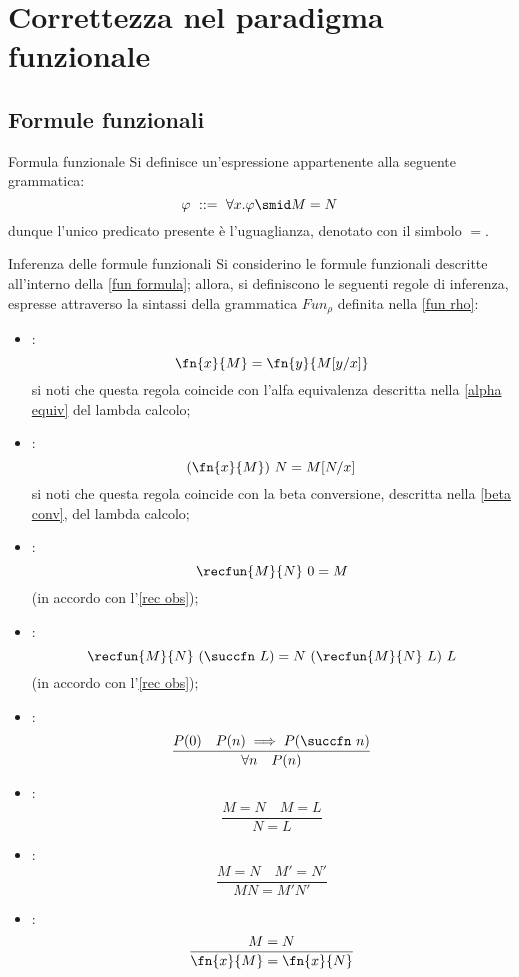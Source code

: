 \documentclass[a4paper, 12pt]{report}
\begin{document}
    \section{Correttezza nel paradigma funzionale}

    \subsection{Formule funzionali}

    \begin{frameddefn}[label={fun formula}]{Formula funzionale}
        Si definisce  un'espressione appartenente alla seguente grammatica: $$\varphi \ ::= \ \forall x.\varphi \smid M = N$$ dunque l'unico predicato presente è l'uguaglianza, denotato con il simbolo $=$.
    \end{frameddefn}

    \begin{framedprop}[label={= rules}, breakable]{Inferenza delle formule funzionali}
        Si considerino le formule funzionali descritte all'interno della \cref{fun formula}; allora, si definiscono le seguenti regole di inferenza, espresse attraverso la sintassi della grammatica $Fun_\rho$ definita nella \cref{fun rho}:

        \begin{itemize}
            \item {}: $$\fn{x}{M} = \fn{y}{M[y/x]}$$ si noti che questa regola coincide con l'alfa equivalenza descritta nella \cref{alpha equiv} del lambda calcolo;
            \item {}: $$(\fn{x}{M})\ N = M[N/x]$$ si noti che questa regola coincide con la beta conversione, descritta nella \cref{beta conv}, del lambda calcolo;
            \item {}: $$\recfun{M}{N} \ 0 = M$$ (in accordo con l'\cref{rec obs});
            \item {}: $$\recfun{M}{N} \ (\succfn \ L) = N \ (\recfun{M}{N} \ L) \ L$$ (in accordo con l'\cref{rec obs});
            \item {}: $$\dfrac{P(0) \quad P(n) \implies P(\succfn \ n)}{\forall n \quad P(n)}$$
            \item {}: $$\dfrac{M = N \quad M = L}{N = L}$$
            \item {}: $$\dfrac{M = N \quad M' = N'}{MN = M'N'}$$
            \item {}: $$\dfrac{M= N}{\fn{x}{M} = \fn{x}{N}}$$
        \end{itemize}
    \end{framedprop}
\end{document}
